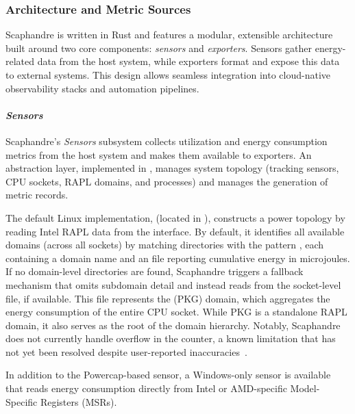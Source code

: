 \subsubsection{Architecture and Metric Sources}
\label{sec:scaphandre-architecture}

Scaphandre is written in Rust and features a modular, extensible architecture built around two core components: \textit{sensors} and \textit{exporters}. Sensors gather energy-related data from the host system, while exporters format and expose this data to external systems. This design allows seamless integration into cloud-native observability stacks and automation pipelines.

\paragraph{\textit{Sensors}}

Scaphandre’s \textit{Sensors} subsystem collects utilization and energy consumption metrics from the host system and makes them available to exporters. An abstraction layer, implemented in , manages system topology (tracking sensors, CPU sockets, RAPL domains, and processes) and manages the generation of metric records.

The default Linux implementation,  (located in ), constructs a power topology by reading Intel RAPL data from the  interface. By default, it identifies all available domains (across all sockets) by matching directories with the pattern , each containing a domain name and an  file reporting cumulative energy in microjoules. If no domain-level directories are found, Scaphandre triggers a fallback mechanism that omits subdomain detail and instead reads from the socket-level file, if available. This file represents the  (PKG) domain, which aggregates the energy consumption of the entire CPU socket. While PKG is a standalone RAPL domain, it also serves as the root of the domain hierarchy. Notably, Scaphandre does not currently handle overflow in the  counter, a known limitation that has not yet been resolved despite user-reported inaccuracies~\cite{scaphandre_issue280}.

In addition to the Powercap-based sensor, a Windows-only sensor is available that reads energy consumption directly from Intel or AMD-specific Model-Specific Registers (MSRs).

